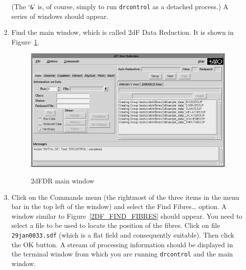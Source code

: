 \documentclass[twoside,11pt]{article}
\begin{document}
\begin{enumerate}
   (The `{\tt \&}' is, of course, simply to run {\tt drcontrol} as a
   detached process.)  A series of windows should appear.

  \item Find the main window, which is called {\sf 2dF Data Reduction}.
   It is shown in Figure~\ref{2DF_DATA_REDUCTION}.

  \begin{figure}[htbp]
     \centering
     \includegraphics[totalheight=3.5in]{sc14_2df_data_reduction.ps}
     \begin{quote}
     \caption{2dFDR main window
     \label{2DF_DATA_REDUCTION} }
     \end{quote}
  \end{figure}

  \item Click on the {\sf Commands} menu (the rightmost of the three 
   items in the menu bar in the top left of the window) and
   select the {\sf Find Fibres\ldots} option.  A window similar to
   Figure~\ref{2DF_FIND_FIBRES} should appear.  You need to select a
   file to be used to locate the position of the fibres.  Click on
   file {\tt 29jan0033.sdf} (which is a flat field and consequently
   suitable).  Then click the {\sf OK} button.  A stream of processing
   information should be displayed in the terminal window from which
   you are running {\tt drcontrol} and the main window.


\end{enumerate}
\end{document}
